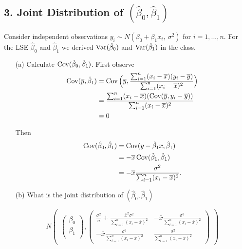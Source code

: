 \documentclass{tufte-book}
\begin{document}
\subsection{3. Joint Distribution of $(\hat{\beta}_0, \hat{\beta}_1)$} Consider independent observations $y_i \sim N(\beta_0+\beta_1x_i,\ \sigma^2)$ for $i=1,...,n$. For the LSE $\hat{\beta}_0$ and $\hat{\beta}_1$ we derived $\operatorname{Var}(\hat{\beta}_0)$ and $\operatorname{Var}(\hat{\beta}_1)$ in the class.

\begin{enumerate}

\item[(a)] Calculate $\operatorname{Cov}(\hat{\beta}_0,\hat{\beta}_1)$.
First observe
\begin{align*}
\operatorname{Cov}(\overline{y}, \hat{\beta}_1) &= \operatorname{Cov}\Big(\overline{y}, \frac{\sum_{i=1}^n(x_i-\overline{x})(y_i-\overline{y})}{\sum_{i=1}^n(x_i-\overline{x})^2}\Big)\\
&= \frac{\sum_{i=1}^n(x_i - \overline{x})(\operatorname{Cov}(\overline{y}, y_i-\overline{y}))}{\sum_{i=1}^n(x_i-\overline{x})^2}\\
&= 0
\end{align*}

Then
\begin{align*}
\operatorname{Cov}(\hat{\beta}_0, \hat{\beta}_1) &= \operatorname{Cov}(\overline{y}-\hat{\beta}_1\overline{x}, \hat{\beta}_1)\\
&= -\overline{x}\operatorname{Cov}(\hat{\beta}_1,\hat{\beta}_1)\\
&= -\overline{x}\frac{\sigma^2}{\sum_{i=1}^n(x_i-\overline{x})^2}.
\end{align*}

\item[(b)] What is the joint distribution of $(\hat{\beta}_0,\hat{\beta}_1)$

\[ N
\begin{pmatrix}

\begin{pmatrix}
\beta_0\\
\beta_1\\
\end{pmatrix}
,\begin{pmatrix}
\frac{\sigma^2}{n} + \frac{\overline{x}^2\sigma^2}{\sum_{i=1}^n(x_i-\overline{x})^2} & -\overline{x}\frac{\sigma^2}{\sum_{i=1}^n(x_i-\overline{x})^2}\\
-\overline{x}\frac{\sigma^2}{\sum_{i=1}^n(x_i-\overline{x})^2} & \frac{\sigma^2}{\sum_{i=1}^n(x_i-\overline{x})^2}
\end{pmatrix}

\end{pmatrix}
\]
\end{enumerate}
\end{document}
